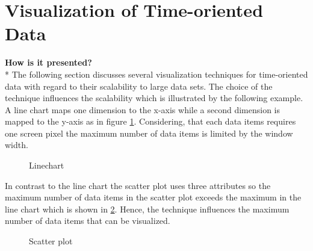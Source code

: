 \section{Visualization of Time-oriented Data} \label{vis}
\textbf{How is it presented?}\\*
The following section discusses several visualization techniques for time-oriented data with regard to their scalability to large data sets. The choice of the technique influences the scalability which is illustrated by the following example. 
A line chart maps one dimension to the x-axis while a second dimension is mapped to the y-axis as in figure \ref{fig:linechart}. Considering, that each data items requires one screen pixel the maximum number of data items is limited by the window width. 
\begin{figure}[H]
    \centering
    \caption{Linechart}
    \label{fig:linechart}
\end{figure}
 
In contrast to the line chart the scatter plot uses three attributes so the maximum number of data items in the scatter plot exceeds the maximum in the line chart which is shown in \ref{fig:scatterplot}. Hence, the technique influences the maximum number of data items that can be visualized. 
\begin{figure}[H]
    \centering
    \caption{Scatter plot}
    \label{fig:scatterplot}
\end{figure}
 

